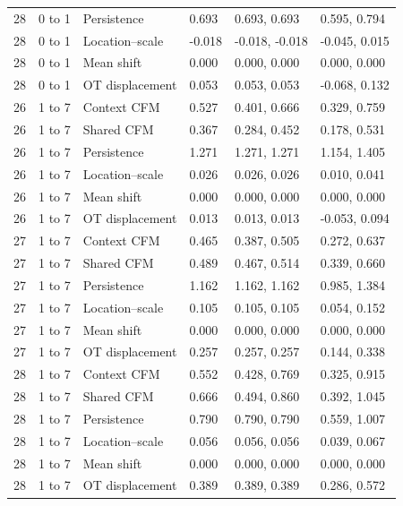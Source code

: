 {\begin{longtable}{@{}p{14mm}p{18mm}p{36mm}p{24mm}p{32mm}p{39mm}@{}}
28 & 0 to 1 & Persistence & 0.693 & 0.693, 0.693 & 0.595, 0.794\\
28 & 0 to 1 & Location--scale & -0.018 & -0.018, -0.018 & -0.045, 0.015\\
28 & 0 to 1 & Mean shift & 0.000 & 0.000, 0.000 & 0.000, 0.000\\
28 & 0 to 1 & OT displacement & 0.053 & 0.053, 0.053 & -0.068, 0.132\\
26 & 1 to 7 & Context CFM & 0.527 & 0.401, 0.666 & 0.329, 0.759\\
26 & 1 to 7 & Shared CFM & 0.367 & 0.284, 0.452 & 0.178, 0.531\\
26 & 1 to 7 & Persistence & 1.271 & 1.271, 1.271 & 1.154, 1.405\\
26 & 1 to 7 & Location--scale & 0.026 & 0.026, 0.026 & 0.010, 0.041\\
26 & 1 to 7 & Mean shift & 0.000 & 0.000, 0.000 & 0.000, 0.000\\
26 & 1 to 7 & OT displacement & 0.013 & 0.013, 0.013 & -0.053, 0.094\\
27 & 1 to 7 & Context CFM & 0.465 & 0.387, 0.505 & 0.272, 0.637\\
27 & 1 to 7 & Shared CFM & 0.489 & 0.467, 0.514 & 0.339, 0.660\\
27 & 1 to 7 & Persistence & 1.162 & 1.162, 1.162 & 0.985, 1.384\\
27 & 1 to 7 & Location--scale & 0.105 & 0.105, 0.105 & 0.054, 0.152\\
27 & 1 to 7 & Mean shift & 0.000 & 0.000, 0.000 & 0.000, 0.000\\
27 & 1 to 7 & OT displacement & 0.257 & 0.257, 0.257 & 0.144, 0.338\\
28 & 1 to 7 & Context CFM & 0.552 & 0.428, 0.769 & 0.325, 0.915\\
28 & 1 to 7 & Shared CFM & 0.666 & 0.494, 0.860 & 0.392, 1.045\\
28 & 1 to 7 & Persistence & 0.790 & 0.790, 0.790 & 0.559, 1.007\\
28 & 1 to 7 & Location--scale & 0.056 & 0.056, 0.056 & 0.039, 0.067\\
28 & 1 to 7 & Mean shift & 0.000 & 0.000, 0.000 & 0.000, 0.000\\
28 & 1 to 7 & OT displacement & 0.389 & 0.389, 0.389 & 0.286, 0.572\\
\end{longtable}
}
